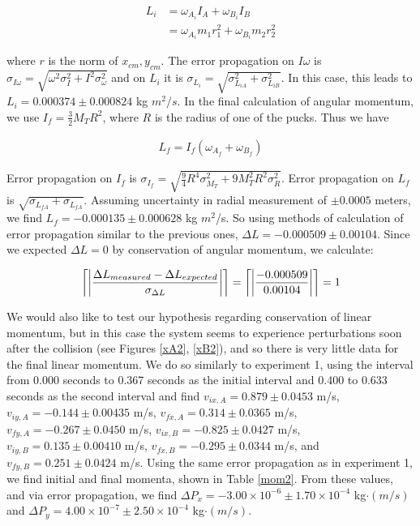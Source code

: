 \documentclass[11pt]{article}
\DeclarePairedDelimiter{\ceil}{\lceil}{\rceil}
\begin{document}
\begin{align}
L_i &= \omega_{A_i}I_A + \omega_{B_i}I_B\\
&=  \omega_{A_i}m_1 r_1^2 + \omega_{B_i}m_2 r_2^2
\end{align}

where $r$ is the norm of $x_{cm}, y_{cm}$. The error propagation on $I\omega $ is $\sigma_{I\omega} = \sqrt{\omega^2\sigma_I^2 + I^2\sigma_{\omega}^2}$ and on $L_i$ it is $\sigma_{L_i} = \sqrt{\sigma_{L_{iA}}^2+\sigma_{L_{iB}}^2}$. In this case, this leads to $L_i = 0.000374\pm 0.000824$ kg $m^2/s$. In the final calculation of angular momentum, we use $I_f=\frac{3}{2}M_TR^2$, where $R$ is the radius of one of the pucks. Thus we have

\begin{align}
L_f = I_f(\omega_{A_f}+ \omega_{B_f})
\end{align}

Error propagation on $I_f$ is $\sigma_{I_f} = \sqrt{\frac{9}{4}R^4\sigma_{M_T}^2+9M_T^2R^2\sigma_{R}^2}$. Error propagation on $L_f$ is $\sqrt{\sigma_{L_{fA}}+\sigma_{L_{fA}}}$. Assuming uncertainty in radial measurement of $\pm 0.0005$ meters, we find $L_f = -0.000135\pm 0.000628$ kg $m^2$/s. So using methods of calculation of error propagation similar to the previous ones, $\Delta L = -0.000509 \pm 0.00104$. Since we expected $\Delta L = 0$ by conservation of angular momentum, we calculate:

\begin{align}
\ceil*{\left\vert\frac{\Delta L_{measured}-\Delta L_{expected}}{\sigma_{\Delta L}}\right\vert} = \ceil*{\left\vert\frac{-0.000509}{0.00104}\right\vert} = 1
\label{errL}
\end{align}

We would also like to test our hypothesis regarding conservation of linear momentum, but in this case the system seems to experience perturbations soon after the collision (see Figures \ref{xA2}, \ref{xB2}), and so there is very little data for the final linear momentum. We do so similarly to experiment 1, using the interval from 0.000 seconds to 0.367 seconds as the initial interval and 0.400 to 0.633 seconds as the second interval and find $v_{ix,A} = 0.879\pm0.0453$ m/s, $v_{iy,A} = -0.144\pm0.00435$ m/s, $v_{fx,A} = 0.314\pm0.0365$ m/s, $v_{fy,A} = -0.267\pm0.0450$ m/s, $v_{ix,B} = -0.825\pm0.0427$ m/s, $v_{iy,B} = 0.135\pm0.00410$ m/s, $v_{fx,B} = -0.295\pm0.0344$ m/s, and $v_{fy,B} = 0.251\pm0.0424$ m/s. Using the same error propagation as in experiment 1, we find initial and final momenta, shown in Table \ref{mom2}. From these values, and via error propagation, we find $\Delta P_x = -3.00\times10^{-6}\pm1.70\times 10^{-4}$ kg$\cdot(m/s)$ and $\Delta P_y = 4.00\times10^{-7}\pm2.50\times10^{-4}$ kg$\cdot(m/s)$.
\end{document}
